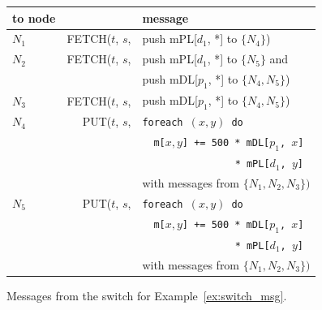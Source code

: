

\begin{figure}
\begin{center}
\begin{tabular}{l|r@{~}l}
to node & & message \\
\hline
$N_1$ & FETCH($t$, $s$, & push mPL[$d_1$, *] to $\{N_4\}$) \\[.7ex]
$N_2$ & FETCH($t$, $s$, & push mPL[$d_1$, *] to $\{N_5\}$ and \\
      &                 & push mDL[$p_1$, *] to $\{N_4, N_5\}$) \\[.7ex]
$N_3$ & FETCH($t$, $s$, & push mDL[$p_1$, *] to $\{N_4, N_5\}$) \\[.7ex]
$N_4$ & PUT($t$,   $s$, & {\tt foreach $(x,y)$ do} \\
      &                 & ~~{\tt m[$x,y$] += 500 * mDL[$p_1$, $x$]} \\
      &                 & ~~{\tt ~~~~~~~~~~~~~ * mPL[$d_1$, $y$]} \\
      &                 & with messages from $\{N_1, N_2, N_3\})$ \\[.7ex]
$N_5$ & PUT($t$,   $s$, & {\tt foreach $(x,y)$ do} \\
      &                 & ~~{\tt m[$x,y$] += 500 * mDL[$p_1$, $x$]} \\
      &                 & ~~{\tt ~~~~~~~~~~~~~ * mPL[$d_1$, $y$]} \\
      &                 & with messages from $\{N_1, N_2, N_3\})$
\end{tabular}
\end{center}

\vspace{-4mm}

\caption{Messages from the switch for Example~\ref{ex:switch_msg}.}
\label{fig:switch_msg}
\end{figure}



